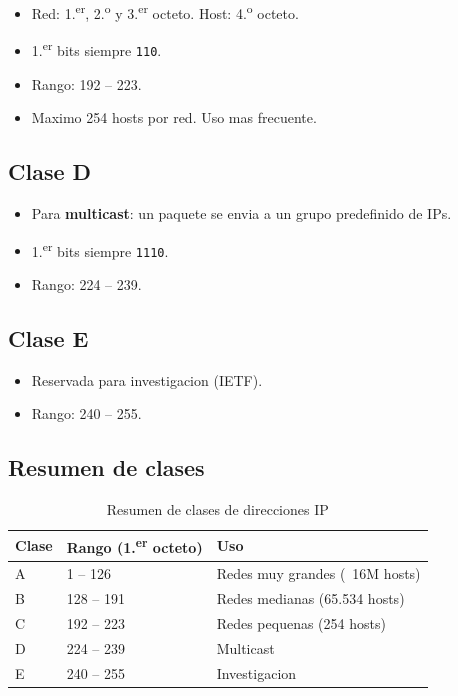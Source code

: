 \begin{itemize}
    \item Red: 1.\textsuperscript{er}, 2.\textsuperscript{o} y 3.\textsuperscript{er} octeto. Host: 4.\textsuperscript{o} octeto.
    \item 1.\textsuperscript{er} bits siempre \texttt{110}.
    \item Rango: 192 -- 223.
    \item Maximo 254 hosts por red. Uso mas frecuente.
\end{itemize}

\subsection{Clase D}

\begin{itemize}
    \item Para \textbf{multicast}: un paquete se envia a un grupo predefinido de IPs.
    \item 1.\textsuperscript{er} bits siempre \texttt{1110}.
    \item Rango: 224 -- 239.
\end{itemize}

\subsection{Clase E}

\begin{itemize}
    \item Reservada para investigacion (IETF).
    \item Rango: 240 -- 255.
\end{itemize}

\subsection{Resumen de clases}

\begin{table}[htbp]
\centering
\small
\caption{Resumen de clases de direcciones IP}
\begin{tabularx}{\textwidth}{@{}lXX@{}}
\toprule
\textbf{Clase} & \textbf{Rango (1.\textsuperscript{er} octeto)} & \textbf{Uso} \\
\midrule
A & 1 -- 126 & Redes muy grandes (~16M hosts) \\
B & 128 -- 191 & Redes medianas (65.534 hosts) \\
C & 192 -- 223 & Redes pequenas (254 hosts) \\
D & 224 -- 239 & Multicast \\
E & 240 -- 255 & Investigacion \\
\bottomrule
\end{tabularx}
\end{table}

